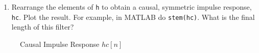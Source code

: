 \documentclass[fleqn]{article}
\begin{document}
\begin{enumerate}
\begin{enumerate}[nolistsep]
			\item Rearrange the elements of \texttt{h} to obtain a causal, symmetric impulse response, \texttt{hc}. Plot the result. For example, in MATLAB do \texttt{stem(hc)}. What is the final length of this filter?
		\end{enumerate}
		
			\begin{figure}[H]
				\centerline{}
				\caption{Causal Impulse Response $hc[n]$}
			\end{figure}
	\end{enumerate}
	
	
	
\end{document}
